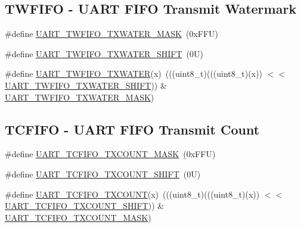 \subsection*{T\+W\+F\+I\+FO -\/ U\+A\+RT F\+I\+FO Transmit Watermark}
\begin{DoxyCompactItemize}
\item 
\#define \mbox{\hyperlink{group___u_a_r_t___register___masks_ga4d1d724beef4708553a5066491ebf32e}{U\+A\+R\+T\+\_\+\+T\+W\+F\+I\+F\+O\+\_\+\+T\+X\+W\+A\+T\+E\+R\+\_\+\+M\+A\+SK}}~(0x\+F\+F\+U)
\item 
\#define \mbox{\hyperlink{group___u_a_r_t___register___masks_ga55b227e0cf4669aec87ec3fb3bb494c8}{U\+A\+R\+T\+\_\+\+T\+W\+F\+I\+F\+O\+\_\+\+T\+X\+W\+A\+T\+E\+R\+\_\+\+S\+H\+I\+FT}}~(0\+U)
\item 
\#define \mbox{\hyperlink{group___u_a_r_t___register___masks_gaefe25e2834c190a10976bb2a2c0708db}{U\+A\+R\+T\+\_\+\+T\+W\+F\+I\+F\+O\+\_\+\+T\+X\+W\+A\+T\+ER}}(x)~(((uint8\+\_\+t)(((uint8\+\_\+t)(x)) $<$$<$ \mbox{\hyperlink{group___u_a_r_t___register___masks_ga55b227e0cf4669aec87ec3fb3bb494c8}{U\+A\+R\+T\+\_\+\+T\+W\+F\+I\+F\+O\+\_\+\+T\+X\+W\+A\+T\+E\+R\+\_\+\+S\+H\+I\+FT}})) \& \mbox{\hyperlink{group___u_a_r_t___register___masks_ga4d1d724beef4708553a5066491ebf32e}{U\+A\+R\+T\+\_\+\+T\+W\+F\+I\+F\+O\+\_\+\+T\+X\+W\+A\+T\+E\+R\+\_\+\+M\+A\+SK}})
\end{DoxyCompactItemize}
\subsection*{T\+C\+F\+I\+FO -\/ U\+A\+RT F\+I\+FO Transmit Count}
\begin{DoxyCompactItemize}
\item 
\#define \mbox{\hyperlink{group___u_a_r_t___register___masks_gab3c6a27ca034de86ac2aa4f5c55781f2}{U\+A\+R\+T\+\_\+\+T\+C\+F\+I\+F\+O\+\_\+\+T\+X\+C\+O\+U\+N\+T\+\_\+\+M\+A\+SK}}~(0x\+F\+F\+U)
\item 
\#define \mbox{\hyperlink{group___u_a_r_t___register___masks_gaae504c1c6564913b0daeaf835defa8aa}{U\+A\+R\+T\+\_\+\+T\+C\+F\+I\+F\+O\+\_\+\+T\+X\+C\+O\+U\+N\+T\+\_\+\+S\+H\+I\+FT}}~(0\+U)
\item 
\#define \mbox{\hyperlink{group___u_a_r_t___register___masks_gad083a41f9d63f7351e3b8e7507ad42f5}{U\+A\+R\+T\+\_\+\+T\+C\+F\+I\+F\+O\+\_\+\+T\+X\+C\+O\+U\+NT}}(x)~(((uint8\+\_\+t)(((uint8\+\_\+t)(x)) $<$$<$ \mbox{\hyperlink{group___u_a_r_t___register___masks_gaae504c1c6564913b0daeaf835defa8aa}{U\+A\+R\+T\+\_\+\+T\+C\+F\+I\+F\+O\+\_\+\+T\+X\+C\+O\+U\+N\+T\+\_\+\+S\+H\+I\+FT}})) \& \mbox{\hyperlink{group___u_a_r_t___register___masks_gab3c6a27ca034de86ac2aa4f5c55781f2}{U\+A\+R\+T\+\_\+\+T\+C\+F\+I\+F\+O\+\_\+\+T\+X\+C\+O\+U\+N\+T\+\_\+\+M\+A\+SK}})
\end{DoxyCompactItemize}
